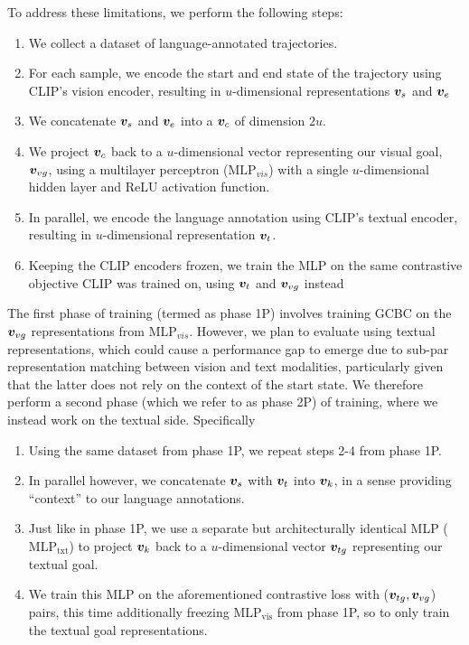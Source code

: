 \documentclass[../main.tex]{subfiles}
\begin{document}
To address these limitations, we perform the following steps:

\begin{enumerate}
	\item We collect a dataset of language-annotated trajectories.
	\item For each sample, we encode the start and end state of the trajectory using CLIP's vision
	      encoder, resulting in $u$-dimensional representations $\bm v_s$ and $\bm v_e$
	\item We concatenate $\bm v_s$ and $\bm v_e$ into a $\bm v_c$ of dimension $2u$.
	\item We project $\bm v_c$ back to a $u$-dimensional vector representing our visual goal,
	      $\bm v_{vg}$, using a multilayer perceptron ($\text{MLP}_{vis}$) with a single $u$-dimensional hidden layer
	      and ReLU activation function.
	\item In parallel, we encode the language annotation using CLIP's textual encoder, resulting in
	      $u$-dimensional representation $\bm v_t$.
	\item Keeping the CLIP encoders frozen, we train the MLP on the same contrastive objective CLIP was
	      trained on, using $\bm v_t$ and $\bm v_{vg}$ instead
\end{enumerate}

The first phase of training (termed as phase 1P) involves training GCBC on the $\bm v_{vg}$ representations from $\text{MLP}_{vis}$. However, we plan to evaluate using textual representations, which could cause a performance gap to emerge due to sub-par representation matching between vision and text
modalities, particularly given that the latter does not rely on the context of the start state. We therefore perform a second phase (which we refer to as phase 2P) of training, where
we instead work on the textual side. Specifically

\begin{enumerate}
	\item Using the same dataset from phase 1P, we repeat steps 2-4 from phase 1P.
	\item In parallel however, we concatenate $\bm v_s$ with $\bm v_t$ into $\bm v_k$, in
	      a sense providing ``context'' to our language annotations.
	\item Just like in phase 1P, we use a separate but architecturally identical MLP ($\text{MLP}_\text{txt}$) to project
	      $\bm v_k$ back to a $u$-dimensional vector $\bm v_{tg}$ representing our textual
	      goal.
	\item We train this MLP on the aforementioned contrastive loss with
	      ($\bm v_{tg}, \bm v_{vg}$) pairs, this time additionally freezing $\text{MLP}_\text{vis}$ from phase
	      1P, so to only train the textual goal representations.
\end{enumerate}
\end{document}
